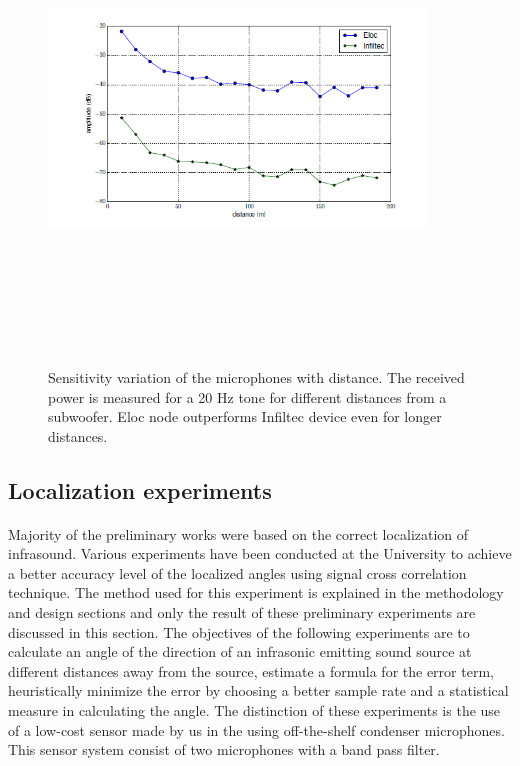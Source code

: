 \documentclass[12pt]{article}
\numberwithin{figure}{section}
\numberwithin{table}{section}
\begin{document}
\begin{figure}[H]
\centering
\includegraphics[width=10cm,height=13cm,keepaspectratio]{eloc_vs_infiltec2.png}
\caption[Sensitivity variation of the microphones with distance.]{Sensitivity variation of the microphones with distance.
The received power is measured for a 20 Hz tone
for different distances from a subwoofer. Eloc node outperforms
Infiltec device even for longer distances.}
\label{infiltec:eloc2}
\end{figure}

\subsection{Localization experiments}
\paragraph{}
Majority of the preliminary works were based on the correct localization of infrasound. Various experiments have been conducted at the University to achieve a better accuracy level of the localized angles using signal cross correlation technique. The method used for this experiment is explained in the methodology and design sections and only the result of these preliminary experiments are discussed in this section. The objectives of the following experiments are to calculate an angle of the direction of an infrasonic emitting sound source at different distances away from the source, estimate a formula for the error term, heuristically minimize the error by choosing a better sample rate and a statistical measure in calculating the angle. The distinction of these experiments is the use of a low-cost sensor made by us in the using off-the-shelf condenser microphones. This sensor  system consist of two microphones with a band pass filter.
\end{document}
